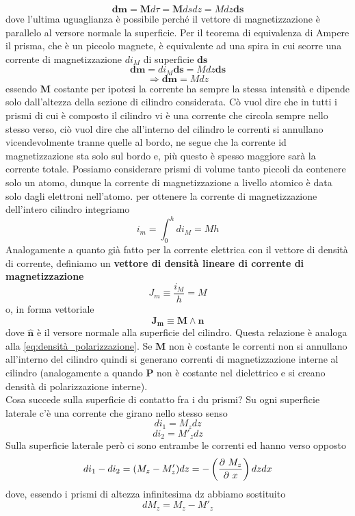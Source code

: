 \documentclass[
10pt, %
a4paper, %
oneside, %
headinclude,footinclude, %
BCOR5mm, %
]{scrartcl}
\begin{document}
\[\mathbf{dm} = \mathbf{M}d\tau = \mathbf{M} ds dz = M dz \mathbf{ds}\]  
dove l'ultima uguaglianza è possibile perché il vettore di magnetizzazione è parallelo al versore normale la superficie. Per il teorema di equivalenza di Ampere il prisma, che è un piccolo magnete, è equivalente ad una spira in cui scorre una corrente di magnetizzazione \(di_M\) di superficie \(\mathbf{ds}\)
\[\mathbf{dm} = di_M \mathbf{ds} = M dz \mathbf{ds}\]
\[\Rightarrow \mathbf{dm} = M dz\]
essendo \(\mathbf{M}\) costante per ipotesi la corrente ha sempre la stessa intensità e dipende solo dall'altezza della sezione di cilindro considerata. Cò vuol dire che in tutti i prismi di cui è composto il cilindro vi è una corrente che circola sempre nello stesso verso, ciò vuol dire che all'interno del cilindro le correnti si annullano vicendevolmente tranne quelle al bordo, ne segue che la corrente id magnetizzazione sta solo sul bordo e, più questo è spesso maggiore sarà la corrente totale. Possiamo considerare prismi di volume tanto piccoli da contenere solo un atomo, dunque la corrente di magnetizzazione a livello atomico è data solo dagli elettroni nell'atomo. per ottenere la corrente di magnetizzazione dell'intero cilindro integriamo
\[i_m = \int_{0}^{h}di_M=Mh\]
Analogamente a quanto già fatto per la corrente elettrica con il vettore di densità di corrente, definiamo un \textbf{vettore di densità lineare di corrente di magnetizzazione}
\[J_m \equiv \frac{i_M}{h}= M\]
o, in forma vettoriale
\[\mathbf{J_m} \equiv \mathbf{M}\wedge \mathbf{\hat{n}}\]
dove \(\mathbf{\hat{n}}\) è il versore normale alla superficie del cilindro. Questa relazione è analoga alla \ref{eq:densità_polarizzazione}. Se \(\mathbf{M}\) non è costante le correnti non si annullano all'interno del cilindro quindi si generano correnti di magnetizzazione interne al cilindro (analogamente a quando \(\mathbf{P}\) non è costante nel dielettrico e si creano densità di polarizzazione interne).\\
Cosa succede sulla superficie di contatto fra i du prismi? Su ogni superficie laterale c'è una corrente che girano nello stesso senso
\[di_1 = M_z dz\]
\[di_2 = M'_z dz\]
Sulla superficie laterale però ci sono entrambe le correnti ed hanno verso opposto
\[di_1 - di_2= (M_z-M'_z)dz = -\left(\frac{\partial\  M_z}{\partial\  x}\right)dzdx \]
dove, essendo i prismi di altezza infinitesima dz abbiamo sostituito
\[dM_z = M_z - M'_z\]
\end{document}
